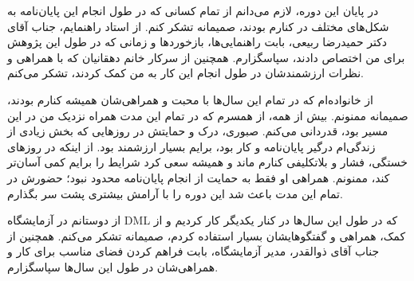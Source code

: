 


\begin{center}
\end{center}


در پایان این دوره، لازم می‌دانم از تمام کسانی که در طول انجام این پایان‌نامه به شکل‌های مختلف در کنارم بودند، صمیمانه تشکر کنم. از استاد راهنمایم، جناب آقای دکتر حمیدرضا ربیعی، بابت راهنمایی‌ها، بازخوردها و زمانی که در طول این پژوهش برای من اختصاص دادند، سپاسگزارم. همچنین از سرکار خانم دهقانیان که با همراهی و نظرات ارزشمندشان در طول انجام این کار به من کمک کردند، تشکر می‌کنم.

از خانواده‌ام که در تمام این سال‌ها با محبت و همراهی‌شان همیشه کنارم بودند، صمیمانه ممنونم. بیش از همه، از همسرم که در تمام این مدت همراه نزدیک من در این مسیر بود، قدردانی می‌کنم. صبوری، درک و حمایتش در روزهایی که بخش زیادی از زندگی‌ام درگیر پایان‌نامه و کار بود، برایم بسیار ارزشمند بود. از اینکه در روزهای خستگی، فشار و بلاتکلیفی کنارم ماند و همیشه سعی کرد شرایط را برایم کمی آسان‌تر کند، ممنونم. همراهی او فقط به حمایت از انجام پایان‌نامه محدود نبود؛ حضورش در تمام این مدت باعث شد این دوره را با آرامش بیشتری پشت سر بگذارم.

از دوستانم در آزمایشگاه DML که در طول این سال‌ها در کنار یکدیگر کار کردیم و از کمک، همراهی و گفتگوهایشان بسیار استفاده کردم، صمیمانه تشکر می‌کنم. همچنین از جناب آقای ذوالقدر، مدیر آزمایشگاه، بابت فراهم کردن فضای مناسب برای کار و همراهی‌شان در طول این سال‌ها سپاسگزارم.
